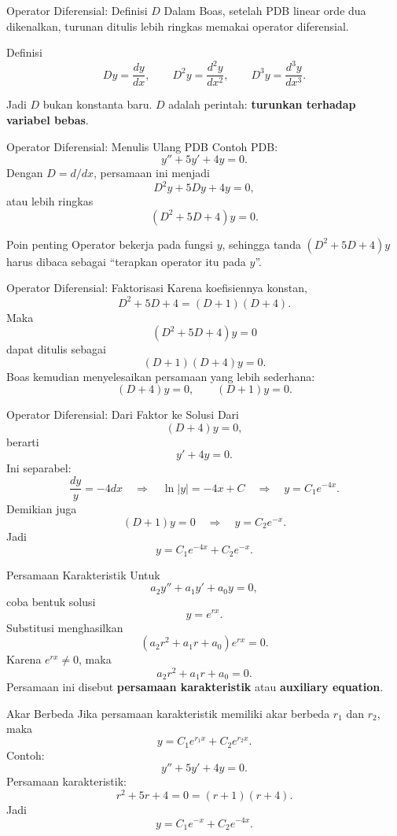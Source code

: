 \documentclass[aspectratio=169,11pt]{beamer}
\begin{document}
\begin{frame}{Operator Diferensial: Definisi $D$}
Dalam Boas, setelah PDB linear orde dua dikenalkan, turunan ditulis lebih ringkas memakai operator diferensial.
\begin{block}{Definisi}
\[
Dy=\frac{dy}{dx},
\qquad
D^2y=\frac{d^2y}{dx^2},
\qquad
D^3y=\frac{d^3y}{dx^3}.
\]
\end{block}
Jadi $D$ bukan konstanta baru. $D$ adalah perintah: \textbf{turunkan terhadap variabel bebas}.
\end{frame}

\begin{frame}{Operator Diferensial: Menulis Ulang PDB}
Contoh PDB:
\[
y''+5y'+4y=0.
\]
Dengan $D=d/dx$, persamaan ini menjadi
\[
D^2y+5Dy+4y=0,
\]
atau lebih ringkas
\[
(D^2+5D+4)y=0.
\]
\begin{alertblock}{Poin penting}
Operator bekerja pada fungsi $y$, sehingga tanda $(D^2+5D+4)y$ harus dibaca sebagai ``terapkan operator itu pada $y$''.
\end{alertblock}
\end{frame}

\begin{frame}{Operator Diferensial: Faktorisasi}
Karena koefisiennya konstan,
\[
D^2+5D+4=(D+1)(D+4).
\]
Maka
\[
(D^2+5D+4)y=0
\]
dapat ditulis sebagai
\[
(D+1)(D+4)y=0.
\]
Boas kemudian menyelesaikan persamaan yang lebih sederhana:
\[
(D+4)y=0,
\qquad
(D+1)y=0.
\]
\end{frame}

\begin{frame}{Operator Diferensial: Dari Faktor ke Solusi}
Dari
\[
(D+4)y=0,
\]
berarti
\[
y'+4y=0.
\]
Ini separabel:
\[
\frac{dy}{y}=-4dx
\quad \Rightarrow \quad
\ln |y|=-4x+C
\quad \Rightarrow \quad
 y=C_1e^{-4x}.
\]
Demikian juga
\[
(D+1)y=0 \quad \Rightarrow \quad y=C_2e^{-x}.
\]
Jadi
\[
\boxed{y=C_1e^{-4x}+C_2e^{-x}}.
\]
\end{frame}

\begin{frame}{Persamaan Karakteristik}
Untuk
\[
a_2y''+a_1y'+a_0y=0,
\]
coba bentuk solusi
\[
y=e^{rx}.
\]
Substitusi menghasilkan
\[
(a_2r^2+a_1r+a_0)e^{rx}=0.
\]
Karena $e^{rx}\neq 0$, maka
\[
\boxed{a_2r^2+a_1r+a_0=0}.
\]
Persamaan ini disebut \textbf{persamaan karakteristik} atau \textbf{auxiliary equation}.
\end{frame}

\begin{frame}{Akar Berbeda}
Jika persamaan karakteristik memiliki akar berbeda $r_1$ dan $r_2$, maka
\[
\boxed{y=C_1e^{r_1x}+C_2e^{r_2x}}.
\]
Contoh:
\[
y''+5y'+4y=0.
\]
Persamaan karakteristik:
\[
r^2+5r+4=0=(r+1)(r+4).
\]
Jadi
\[
y=C_1e^{-x}+C_2e^{-4x}.
\]
\end{frame}
\end{document}
